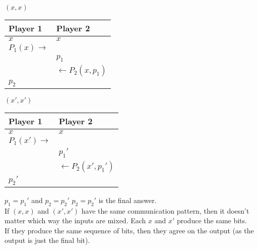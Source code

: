 \documentclass[12pt]{article}
\begin{document}
\begin{multicols}{2}

  $(x, x)$
  \begin{center}
    \begin{tabular}{ |m{7em}|m{7em}| } 
      \hline
      Player 1                   & Player 2 \\ [0.5ex] 
      \hline
      $x$                        & $x$ \\
      $P_{1}(x) \longrightarrow$ &  \\
                                 & $p_{1}$ \\
                                 & $\longleftarrow P_{2}(x, p_{1})$ \\
      $p_{2}$                    & \\
      \hline
    \end{tabular}
  \end{center}

\columnbreak

  $(x', x')$
  \begin{center}
    \begin{tabular}{ |m{7em}|m{7em}| } 
      \hline
      Player 1                   & Player 2 \\ [0.5ex] 
      \hline
      $x$                        & $x$ \\
      $P_{1}(x') \longrightarrow$ &  \\
                                 & $p_{1}'$ \\
                                 & $\longleftarrow P_{2}(x', p_{1}')$ \\
      $p_{2}'$                   & \\
      \hline
    \end{tabular}
  \end{center}

\end{multicols}

$p_{1} = p_{1}'$ and $p_{2} = p_{2}'$
$p_{2} = p_{2}'$ is the final answer.
\\

If $(x, x)$ and $(x', x')$ have the same communication pattern, then it doesn't matter which way the inputs are mixed.
Each $x$ and $x'$ produce the same bits.
\\

If they produce the same sequence of bits, then they agree on the output (as the output is just the final bit).
\\
\end{document}
